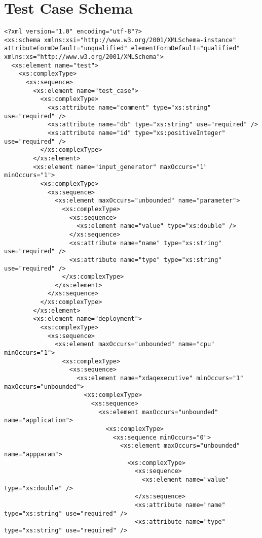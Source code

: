 \section{Test Case Schema}
\begin{verbatim}
<?xml version="1.0" encoding="utf-8"?>
<xs:schema xmlns:xsi="http://www.w3.org/2001/XMLSchema-instance" attributeFormDefault="unqualified" elementFormDefault="qualified" xmlns:xs="http://www.w3.org/2001/XMLSchema">
  <xs:element name="test">
    <xs:complexType>
      <xs:sequence>
        <xs:element name="test_case">
          <xs:complexType>
            <xs:attribute name="comment" type="xs:string" use="required" />
            <xs:attribute name="db" type="xs:string" use="required" />
            <xs:attribute name="id" type="xs:positiveInteger" use="required" />
          </xs:complexType>
        </xs:element>
        <xs:element name="input_generator" maxOccurs="1" minOccurs="1">
          <xs:complexType>
            <xs:sequence>
              <xs:element maxOccurs="unbounded" name="parameter">
                <xs:complexType>
                  <xs:sequence>
                    <xs:element name="value" type="xs:double" />
                  </xs:sequence>
                  <xs:attribute name="name" type="xs:string" use="required" />
                  <xs:attribute name="type" type="xs:string" use="required" />
                </xs:complexType>
              </xs:element>
            </xs:sequence>
          </xs:complexType>
        </xs:element>
        <xs:element name="deployment">
          <xs:complexType>
            <xs:sequence>
              <xs:element maxOccurs="unbounded" name="cpu" minOccurs="1">
                <xs:complexType>
                  <xs:sequence>
                    <xs:element name="xdaqexecutive" minOccurs="1" maxOccurs="unbounded">
                      <xs:complexType>
                        <xs:sequence>
                          <xs:element maxOccurs="unbounded" name="application">
                            <xs:complexType>
                              <xs:sequence minOccurs="0">
                                <xs:element maxOccurs="unbounded" name="appparam">
                                  <xs:complexType>
                                    <xs:sequence>
                                      <xs:element name="value" type="xs:double" />
                                    </xs:sequence>
                                    <xs:attribute name="name" type="xs:string" use="required" />
                                    <xs:attribute name="type" type="xs:string" use="required" />

\end{verbatim}
